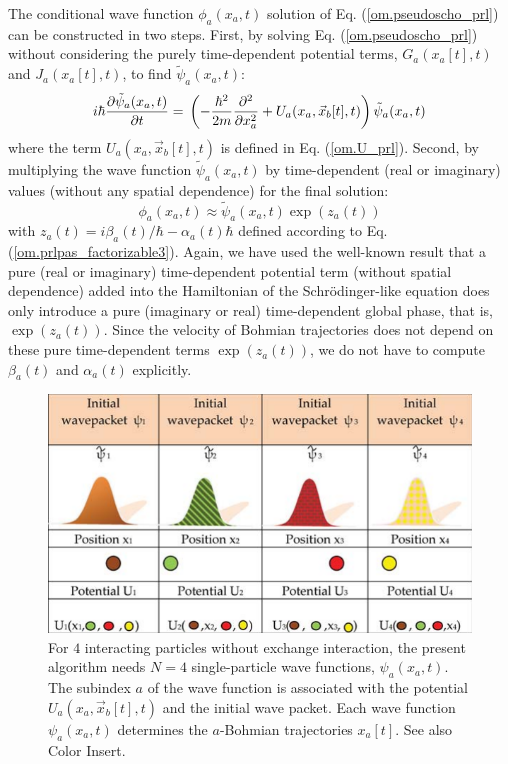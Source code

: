 \documentclass[nofootinbib, secnumarabic, amsmath, nobibnotes,10pt,aps,pra]{revtex4-1}
\newcommand{\eref}[1]{Eq. (\ref{#1})}
\begin{document}
The conditional wave function $\phi_{a}(x_a,t)$ solution of \eref{om.pseudoscho_prl} can be constructed in two steps. First, by solving \eref{om.pseudoscho_prl} without considering the purely time-dependent potential terms, $G_{a}(x_a[t],t)$ and $J_{a}(x_a[t],t)$, to find $\tilde{\psi}_a(x_a,t)$:
\begin{equation}
\label{om.pseudoschobis_prl}
i\hbar\frac{\partial \tilde \psi_{a}(x_{a},t)}{\partial t} = \\ \left( -\frac{\hbar^2}{2m}\frac{\partial^2}{\partial {x_a^2}} + U_{a}(x_{a},\vec x_{b}[t],t) \right) \tilde\psi_{a}(x_{a},t)
\end{equation}
where the term \textit{$U_{a}(x_{a},\vec x_{b}[t],t)$} is defined in \eref{om.U_prl}. Second, by multiplying the wave function $\tilde{\psi}_a(x_a,t)$ by time-dependent (real or imaginary) values (without any spatial dependence) for the final solution:
\begin{equation}
{\phi}_a(x_a,t) \approx \tilde{\psi}_a(x_a,t) \exp (z_a(t))
\label{om.mpnocoulomb}
\end{equation}
with $z_a(t) = i\beta_a(t)/\hbar-\alpha_a(t) \hbar$ defined
according to \eref{om.prlpas_factorizable3}. Again, we have used the
well-known result that a pure (real or imaginary) time-dependent
potential term (without spatial dependence) added into the Hamiltonian of
the Schr\"odinger-like equation does only introduce a pure
(imaginary or real) time-dependent global phase, that is, $\exp (z_a(t))$.
Since the velocity of Bohmian trajectories does not depend on these
pure time-dependent terms \textit{$\exp (z_a(t))$}, we do not have
to compute $\beta_a(t)$ and $\alpha_a(t)$ explicitly.

\begin{figure}
\centering
\includegraphics{F1_04.pdf}
\caption{For $4$ interacting particles without exchange interaction, the present algorithm needs
$N = 4$ single-particle wave functions, $\psi_a(x_a,t)$. The
subindex $a$ of the wave function is associated with the potential
$U_a(x_a,\vec x_b[t],t)$ and the initial wave packet. Each wave
function $\psi_a(x_a,t)$ determines the $a$-Bohmian trajectories
$x_a[t]$. See also Color Insert.}
\label{om_fig_manyprl1}
\end{figure}
\end{document}
